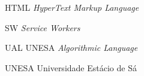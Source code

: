 
\begin{siglas}
  \item[HTML] \textit{HyperText Markup Language}
  \item[SW] \textit{Service Workers}
  \item[UAL] UNESA \textit{Algorithmic Language}
  \item[UNESA] Universidade Estácio de Sá
\end{siglas}
